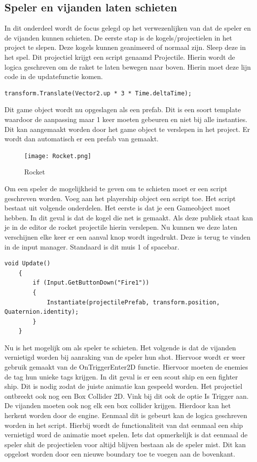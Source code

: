 \subsection{Speler en vijanden laten schieten}
In dit onderdeel wordt de focus gelegd op het verwezenlijken van dat de speler en de vijanden kunnen schieten. 
De eerste stap is de kogels/projectielen in het project te slepen. Deze kogels kunnen geanimeerd of normaal zijn. Sleep deze in het spel. Dit projectiel krijgt een script genaamd Projectile. Hierin wordt de logica geschreven om de raket te laten bewegen naar boven. Hierin moet deze lijn code in de updatefunctie komen.
\begin{lstlisting}[style=csharp]
    transform.Translate(Vector2.up * 3 * Time.deltaTime);
\end{lstlisting}

Dit game object wordt nu opgeslagen als een prefab. Dit is een soort template waardoor de aanpassing maar 1 keer moeten gebeuren en niet bij alle instanties. Dit kan aangemaakt worden door het game object te verslepen in het project. Er wordt dan automatisch er een prefab van gemaakt.

\begin{figure}[H]
    \centering
    \texttt{[image: Rocket.png]}
    \caption{Rocket}
    \label{fig:Rocket}
\end{figure}

Om een speler de mogelijkheid te geven om te schieten moet er een script geschreven worden. Voeg aan het playership object een script toe. Het script bestaat uit volgende onderdelen. Het eerste is dat je een Gameobject moet hebben. In dit geval is dat de kogel die net is gemaakt. Als deze publiek staat kan je in de editor de rocket projectile hierin verslepen. Nu kunnen we deze laten verschijnen elke keer er een aanval knop wordt ingedrukt. Deze is terug te vinden in de input manager. Standaard is dit muis 1 of spacebar.

\begin{lstlisting}[style=csharp]
    void Update()
    {
        if (Input.GetButtonDown("Fire1"))
        {
            Instantiate(projectilePrefab, transform.position, Quaternion.identity);
        }
    }
\end{lstlisting}
Nu is het mogelijk om als speler te schieten. Het volgende is dat de vijanden vernietigd worden bij aanraking van de speler hun shot. Hiervoor wordt er weer gebruik gemaakt van de OnTriggerEnter2D functie. Hiervoor moeten de enemies de tag hun unieke tags krijgen. In dit geval is er een scout ship en een fighter ship. Dit is nodig zodat de juiste animatie kan gespeeld worden. Het projectiel ontbreekt ook nog een Box Collider 2D. Vink bij dit ook de optie Is Trigger aan. De vijanden moeten ook nog elk een box collider krijgen. Hierdoor kan het herkent worden door de engine. Eenmaal dit is gebeurt kan de logica geschreven worden in het script. Hierbij wordt de functionaliteit van dat eenmaal een ship vernietigd word de animatie moet spelen.
Iets dat opmerkelijk is dat eenmaal de speler shit de projectielen voor altijd blijven bestaan als de speler mist. Dit kan opgelost worden door een nieuwe boundary toe te voegen aan de bovenkant.

